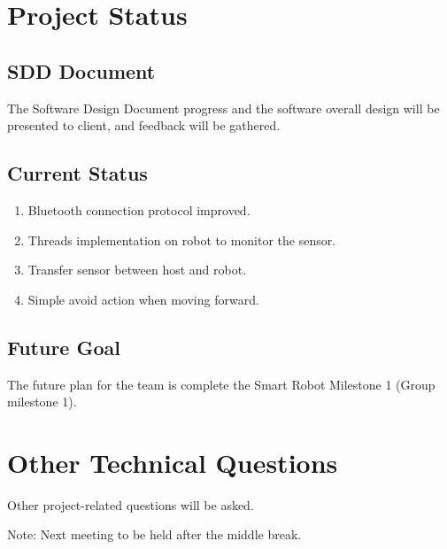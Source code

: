 \documentclass[11pt, a4paper]{article}
\begin{document}
\section{Project Status}

\subsection{SDD Document}
The Software Design Document progress and the software overall design will be presented to client, and feedback will be gathered.

\subsection{Current Status}
\begin{enumerate}
	\item Bluetooth connection protocol improved. 
	\item Threads implementation on robot to monitor the sensor.
	\item Transfer sensor between host and robot.
	\item Simple avoid action when moving forward. 
\end{enumerate}
\subsection{Future Goal}
The future plan for the team is complete the Smart Robot Milestone 1 (Group milestone 1).

\section{Other Technical Questions}
Other project-related questions will be asked.



\vspace*{10pt}
\noindent Note: Next meeting to be held after the middle break.
\end{document}
